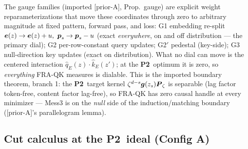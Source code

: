 \documentclass{article}
\newcommand{\gb}{\boldsymbol{g}}
\newcommand{\Ptwo}{\textbf{P2}}
\newcommand{\priorA}{\textsf{[prior-A]}}
\begin{document}
The gauge families (imported \priorA, Prop.\ gauge) are explicit weight
reparameterizations that move these coordinates through zero to arbitrary magnitude
at fixed pattern, forward pass, and loss: G1 embedding re-split
$\eb(z)\to\eb(z)+u,\ \pb_s\to\pb_s-u$ (exact \emph{everywhere}, on and off
distribution --- the primary dial); G2 per-row-constant query updates; G2$'$
pedestal (key-side); G3 null-direction key updates (exact on distribution). What no
dial can move is the centered interaction $\hat q_E(z)\cdot\hat k_E(z')$; at the
\Ptwo\ optimum it is zero, so \emph{everything} FRA-QK measures is dialable. This is
the imported boundary theorem, branch 1: the \Ptwo\ target kernel
$\zeta^{d-s}\gb(z_s)\Pb_\zeta$ is separable (lag factor token-free, content factor
lag-free), so FRA-QK has zero causal handle at every minimizer --- Mess3 is on the
\emph{null} side of the induction/matching boundary (\priorA's parallelogram lemma).

\subsection{Cut calculus at the \Ptwo\ ideal (Config A)}\label{sec:cutcalc}
\end{document}
